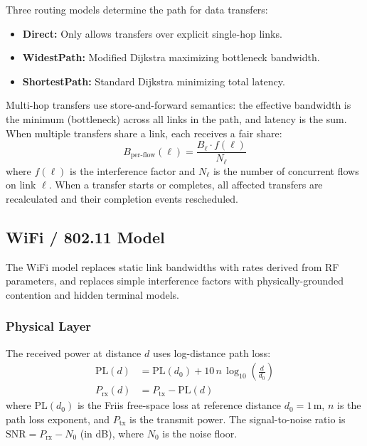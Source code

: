 \documentclass[conference]{IEEEtran}
\begin{document}
Three routing models determine the path for data transfers:

\begin{itemize}[itemsep=1pt,leftmargin=*]
\item \textbf{Direct:} Only allows transfers over explicit single-hop links.
\item \textbf{WidestPath:} Modified Dijkstra maximizing bottleneck bandwidth.
\item \textbf{ShortestPath:} Standard Dijkstra minimizing total latency.
\end{itemize}

Multi-hop transfers use store-and-forward semantics: the effective bandwidth
is the minimum (bottleneck) across all links in the path, and latency is the
sum.  When multiple transfers share a link, each receives a fair share:
\begin{equation}
B_\text{per-flow}(\ell) = \frac{B_\ell \cdot f(\ell)}{N_\ell}
\label{eq:fair_share}
\end{equation}
where $f(\ell)$ is the interference factor and $N_\ell$ is the number of
concurrent flows on link $\ell$.  When a transfer starts or completes, all
affected transfers are recalculated and their completion events rescheduled.

\subsection{WiFi / 802.11 Model}
\label{sec:wifi}

The WiFi model replaces static link bandwidths with rates derived from RF
parameters, and replaces simple interference factors with physically-grounded
contention and hidden terminal models.

\subsubsection{Physical Layer}

The received power at distance $d$ uses log-distance path loss:
\begin{align}
\text{PL}(d) &= \text{PL}(d_0) + 10\,n\,\log_{10}\!\left(\frac{d}{d_0}\right) \label{eq:pathloss} \\
P_\text{rx}(d) &= P_\text{tx} - \text{PL}(d) \label{eq:rxpower}
\end{align}
where $\text{PL}(d_0)$ is the Friis free-space loss at reference distance
$d_0 = 1$\,m, $n$ is the path loss exponent, and $P_\text{tx}$ is the
transmit power.  The signal-to-noise ratio is $\text{SNR} = P_\text{rx} - N_0$
(in dB), where $N_0$ is the noise floor.
\end{document}
